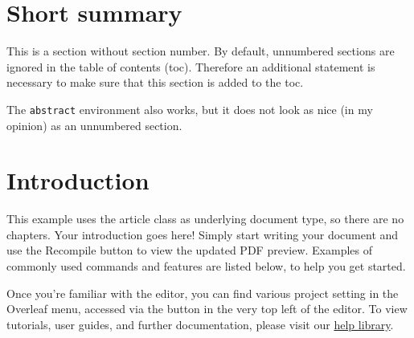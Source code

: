 \documentclass[12pt,a4paper,faculty=ea,language=en,doctype=article]{ugent-doc}
\renewcommand{\ULthickness}{2pt} %
\begin{document}

\maketitle
\renewcommand{\ULthickness}{1pt}


{\hypersetup{hidelinks}\tableofcontents} %
\newpage


\section*{Short summary}

This is a section without section number.
By default, unnumbered sections are ignored in the table of contents (toc).
Therefore an additional statement is necessary to make sure that this section is added to the toc.

The \verb|abstract| environment also works, but it does not look as nice (in my opinion) as an unnumbered section.


\section{Introduction}

This example uses the article class as underlying document type, so there are no chapters.
Your introduction goes here! Simply start writing your document and use the Recompile button to view the updated PDF preview.
Examples of commonly used commands and features are listed below, to help you get started.

Once you're familiar with the editor, you can find various project setting in the Overleaf menu, accessed via the button in the very top left of the editor.
To view tutorials, user guides, and further documentation, please visit our \href{https://www.overleaf.com/learn}{help library}.
\end{document}
